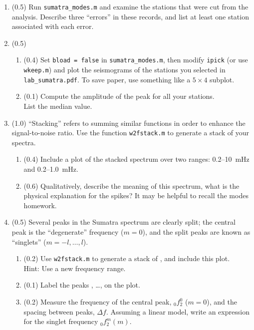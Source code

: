 \documentclass[11pt,titlepage,fleqn]{article}
\begin{document}
\begin{enumerate}

\item (0.5) Run \verb+sumatra_modes.m+ and examine the stations that were cut from the analysis. Describe three ``errors'' in these records, and list at least one station associated with each error.


\item (0.5)
%
\begin{enumerate}
\item (0.4) Set \verb+bload = false+ in \verb+sumatra_modes.m+, then modify \verb+ipick+ (or use \verb+wkeep.m+) and plot the seismograms of the stations you selected in \verb+lab_sumatra.pdf+. To save paper, use something like a $5 \times 4$ subplot.

\item (0.1) Compute the amplitude of the  peak for all your stations. \\
List the median value.
\end{enumerate}


\item (1.0) ``Stacking'' refers to summing similar functions in order to enhance the signal-to-noise ratio. Use the function \verb+w2fstack.m+ to generate a stack of your spectra.
%
\begin{enumerate}
\item (0.4) Include a plot of the stacked spectrum over two ranges: 0.2--10~mHz and 0.2--1.0~mHz.
\item (0.6) Qualitatively, describe the meaning of this spectrum, \eg what is the physical explanation for the spikes? It may be helpful to recall the modes homework.
\end{enumerate}
%


\item (0.5) Several peaks in the Sumatra spectrum are clearly split; the central peak is the ``degenerate'' frequency ($m=0$), and the split peaks are known as ``singlets'' ($m = -l,\ldots,l$). 
%
\begin{enumerate}
\item (0.2) Use \verb+w2fstack.m+ to generate a stack of , and include this plot. \\
Hint: Use a new frequency range.
\item (0.1) Label the peaks , \ldots,  on the plot.
\item (0.2) Measure the frequency of the central peak, $_0f_2^0$ ($m=0$), and the spacing between peaks, $\Delta f$.
Assuming a linear model, write an expression for the singlet frequency $_0f_2^m(m)$.
\end{enumerate}


\end{enumerate}
\end{document}
